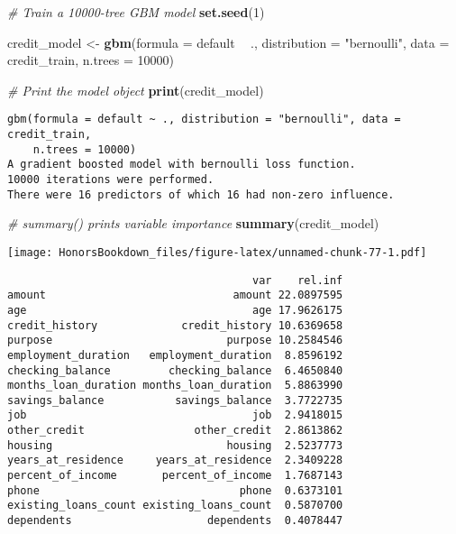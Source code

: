 \documentclass[
]{book}
\newenvironment{Shaded}{\begin{snugshade}}{\end{snugshade}}
\newcommand{\CommentTok}[1]{\textcolor[rgb]{0.56,0.35,0.01}{\textit{#1}}}
\newcommand{\DataTypeTok}[1]{\textcolor[rgb]{0.13,0.29,0.53}{#1}}
\newcommand{\DecValTok}[1]{\textcolor[rgb]{0.00,0.00,0.81}{#1}}
\newcommand{\KeywordTok}[1]{\textcolor[rgb]{0.13,0.29,0.53}{\textbf{#1}}}
\newcommand{\NormalTok}[1]{#1}
\newcommand{\OperatorTok}[1]{\textcolor[rgb]{0.81,0.36,0.00}{\textbf{#1}}}
\newcommand{\StringTok}[1]{\textcolor[rgb]{0.31,0.60,0.02}{#1}}
\begin{document}
\begin{Shaded}
\begin{Highlighting}[]
\CommentTok{# Train a 10000-tree GBM model}
\KeywordTok{set.seed}\NormalTok{(}\DecValTok{1}\NormalTok{)}

\NormalTok{credit_model <-}\StringTok{ }\KeywordTok{gbm}\NormalTok{(}\DataTypeTok{formula =}\NormalTok{ default }\OperatorTok{~}\StringTok{ }\NormalTok{., }
                    \DataTypeTok{distribution =} \StringTok{"bernoulli"}\NormalTok{, }
                    \DataTypeTok{data =}\NormalTok{ credit_train,}
                    \DataTypeTok{n.trees =} \DecValTok{10000}\NormalTok{)}
                    
\CommentTok{# Print the model object                    }
\KeywordTok{print}\NormalTok{(credit_model)}
\end{Highlighting}
\end{Shaded}

\begin{verbatim}
gbm(formula = default ~ ., distribution = "bernoulli", data = credit_train, 
    n.trees = 10000)
A gradient boosted model with bernoulli loss function.
10000 iterations were performed.
There were 16 predictors of which 16 had non-zero influence.
\end{verbatim}

\begin{Shaded}
\begin{Highlighting}[]
\CommentTok{# summary() prints variable importance}
\KeywordTok{summary}\NormalTok{(credit_model)}
\end{Highlighting}
\end{Shaded}

\texttt{[image: HonorsBookdown\_files/figure-latex/unnamed-chunk-77-1.pdf]}

\begin{verbatim}
                                      var    rel.inf
amount                             amount 22.0897595
age                                   age 17.9626175
credit_history             credit_history 10.6369658
purpose                           purpose 10.2584546
employment_duration   employment_duration  8.8596192
checking_balance         checking_balance  6.4650840
months_loan_duration months_loan_duration  5.8863990
savings_balance           savings_balance  3.7722735
job                                   job  2.9418015
other_credit                 other_credit  2.8613862
housing                           housing  2.5237773
years_at_residence     years_at_residence  2.3409228
percent_of_income       percent_of_income  1.7687143
phone                               phone  0.6373101
existing_loans_count existing_loans_count  0.5870700
dependents                     dependents  0.4078447
\end{verbatim}
\end{document}
